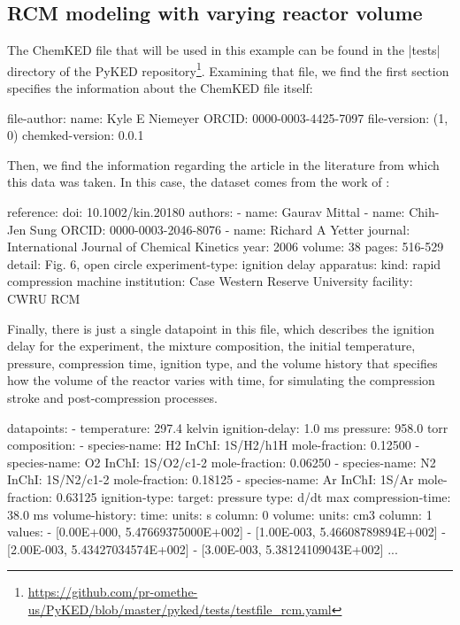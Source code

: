 \documentclass[12pt]{ijck}
\newcommand\ck{ChemKED}
\begin{document}
\subsection{RCM modeling with varying reactor volume}\label{sec:rcm-modeling}

The \ck{} file that will be used in this example can be found in the
\pybox|tests| directory of the PyKED
repository\footnote{\url{https://github.com/pr-omethe-us/PyKED/blob/master/pyked/tests/testfile_rcm.yaml}}.
Examining that file, we find the first section specifies the information about
the \ck{} file itself:
%
\begin{yamlbox}
file-author:
  name: Kyle E Niemeyer
  ORCID: 0000-0003-4425-7097
file-version: (1, 0)
chemked-version: 0.0.1
\end{yamlbox}
%
Then, we find the information regarding the article in the literature from which
this data was taken. In this case, the dataset comes from the work of
\textcite{Mittal2006a}:
%
\begin{yamlbox}
reference:
  doi: 10.1002/kin.20180
  authors:
    - name: Gaurav Mittal
    - name: Chih-Jen Sung
      ORCID: 0000-0003-2046-8076
    - name: Richard A Yetter
  journal: International Journal of Chemical Kinetics
  year: 2006
  volume: 38
  pages: 516-529
  detail: Fig. 6, open circle
experiment-type: ignition delay
apparatus:
  kind: rapid compression machine
  institution: Case Western Reserve University
  facility: CWRU RCM
\end{yamlbox}
%
Finally, there is just a single datapoint in this file, which describes the ignition
delay for the experiment, the mixture composition, the initial temperature,
pressure, compression time, ignition type, and the volume history that specifies
how the volume of the reactor varies with time, for simulating the compression
stroke and post-compression processes.
%
\begin{yamlbox}
datapoints:
  - temperature: 297.4 kelvin
    ignition-delay: 1.0 ms
    pressure: 958.0 torr
    composition:
      - species-name: H2
        InChI: 1S/H2/h1H
        mole-fraction: 0.12500
      - species-name: O2
        InChI: 1S/O2/c1-2
        mole-fraction: 0.06250
      - species-name: N2
        InChI: 1S/N2/c1-2
        mole-fraction: 0.18125
      - species-name: Ar
        InChI: 1S/Ar
        mole-fraction: 0.63125
    ignition-type:
      target: pressure
      type: d/dt max
    compression-time: 38.0 ms
    volume-history:
      time:
        units: s
        column: 0
      volume:
        units: cm3
        column: 1
      values:
        - [0.00E+000, 5.47669375000E+002]
        - [1.00E-003, 5.46608789894E+002]
        - [2.00E-003, 5.43427034574E+002]
        - [3.00E-003, 5.38124109043E+002]
        ...
\end{yamlbox}
\end{document}
